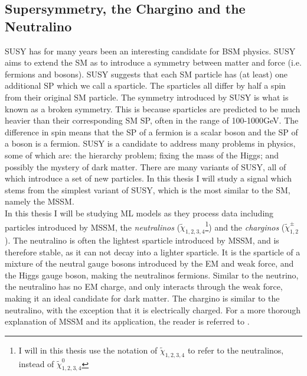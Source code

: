\subsection{Supersymmetry, the Chargino and the Neutralino}\label{subsec:SS}
\acf{SUSY} has for many years been an interesting candidate for \ac{BSM} physics. 
\ac{SUSY} aims to extend the \ac{SM} as to introduce a symmetry between matter and force (i.e. fermions and bosons). 
\ac{SUSY} suggests that each \ac{SM} particle has (at least) one additional \ac{SP} which we call a sparticle. 
The sparticles all differ by half a spin from their original \ac{SM} particle. The symmetry introduced by \ac{SUSY} is what 
is known as a broken symmetry. This is because sparticles are predicted to be much heavier than their corresponding \ac{SM} \ac{SP}, 
often in the range of 100-1000GeV. The difference in spin means that the \ac{SP} of a fermion is a scalar boson and the \ac{SP} 
of a boson is a fermion. \ac{SUSY} is a candidate to address many problems in physics, some of which are: the hierarchy problem; fixing 
the mass of the Higgs; and possibly the mystery of dark matter. There are many variants of \ac{SUSY}, all of which introduce a set 
of new particles. In this thesis I will study a signal which stems from the simplest variant of \ac{SUSY}, which is the most 
similar to the \ac{SM}, namely the \ac{MSSM}. 
\\
In this thesis I will be studying \ac{ML} models as they process data including particles introduced by \ac{MSSM}, the \emph{neutralinos} ($\tilde{\chi}_{1,2,3,4}$\footnote{I will in this thesis 
use the notation of $\tilde{\chi}_{1,2,3,4}$ to refer to the neutralinos, instead of $\tilde{\chi}^0_{1,2,3,4}$}) and 
the \emph{charginos} ($\tilde{\chi}^{\pm}_{1,2}$). The neutralino is often the lightest sparticle introduced by \ac{MSSM}, and is therefore stable, as it can not decay into a lighter sparticle. 
It is the sparticle of a mixture of the neutral gauge bosons introduced by the \ac{EM} and weak force, and the Higgs gauge boson, making the neutralinos  
fermions. Similar to the neutrino, the neutralino has no \ac{EM} charge, and only interacts through the weak force, making it an ideal candidate 
for dark matter. The chargino is similar to the neutralino, with the exception that it is electrically charged. 
For a more thorough explanation of \ac{MSSM} and its application, the reader is referred to \cite{SUSY}. 